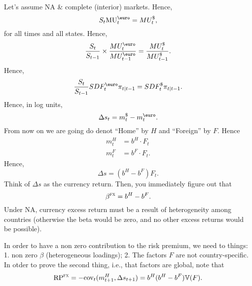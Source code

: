 Let's assume NA \& complete (interior) markets. Hence,
$$
	S_t \text{MU}_t^\text{\euro} = MU_t^\$,
$$
for all times and all states. Hence,
$$
	\frac{S_t}{S_{t-1}}\times \frac{MU_{t}^{\text{\euro}}}{MU_{t-1}^{\text{\euro}}} =  \frac{MU_{t}^{\$}}{MU_{t-1}^{\$}}.
$$
Hence,
$$
	\frac{S_t}{S_{t-1}} SDF_t^\text{\euro}\pi_{t|t-1} = SDF_{t}^\$\pi_{t|t-1}.
$$
Hence, in log units,
$$
	\Delta s_t = m_t^{\$} - m_t^\text{\euro}	.
$$
From now on we are going do denot ``Home'' by $H$ and ``Foreign'' by $F$. Hence
$$
	\begin{aligned}
		m_t^H &= b^H \cdot F_t\\
		m_t^F &= b^F \cdot F_t.
	\end{aligned}
$$
Hence,
$$
	\Delta s = (b^H - b^F) F_t.
$$	
Think of $\Delta s$ as the currency return. Then, you immediately figure out that 
$$
	\beta^{\textsc{fx}} = b^H - b^F.		
$$
Under NA, currency excess return must be a result of heterogeneity among countries (otherwise the beta would be zero, and no other excess returns would be possible).

In order to have a non zero contribution to the risk premium, we need to things: 1. non zero $\beta$ (heterogeneous loadings); 2. The factors $F$ are not country-specific.
In otder to prove the second thing, i.e., that factors are global, note that
$$
	\text{RP}^{\textsc{fx}} = - \text{cov}_t(m_{t+1}^H, \Delta s_{t+1}) = b^H(b^H-b^F)\mathbb{V}(F).
$$